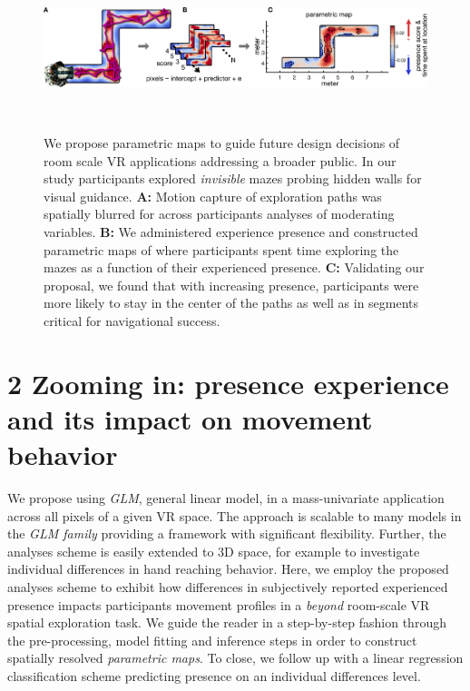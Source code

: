 \begin{figure}[!ht]
\centering
  \includegraphics[width=\linewidth]{figures/fig1.pdf}
  \caption{We propose parametric maps to guide future design decisions of room scale VR applications addressing a broader public. In our study participants explored \textit{invisible} mazes probing hidden walls for visual guidance. \textbf{A:} Motion capture of exploration paths was spatially blurred for across participants analyses of moderating variables. \textbf{B:} We administered experience presence and constructed parametric maps of where participants spent time exploring the mazes as a function of their experienced presence. \textbf{C:} Validating our proposal, we found that with increasing presence, participants were more likely to stay in the center of the paths as well as in segments critical for navigational success.}~\label{fig:methods}
\end{figure}

\section{2 Zooming in: presence experience and its impact on movement behavior}
We propose using \textit{GLM}, general linear model, in a mass-univariate application across all pixels of a given VR space. The approach is scalable to many models in the \textit{GLM family} providing a framework with significant flexibility. Further, the analyses scheme is easily extended to 3D space, for example to investigate individual differences in hand reaching behavior. Here, we employ the proposed analyses scheme to exhibit how differences in subjectively reported experienced presence impacts participants movement profiles in a \textit{beyond} room-scale VR spatial exploration task. We guide the reader in a step-by-step fashion through the pre-processing, model fitting and inference steps in order to construct spatially resolved \textit{parametric maps}. To close, we follow up with a linear regression classification scheme predicting presence on an individual differences level. 



